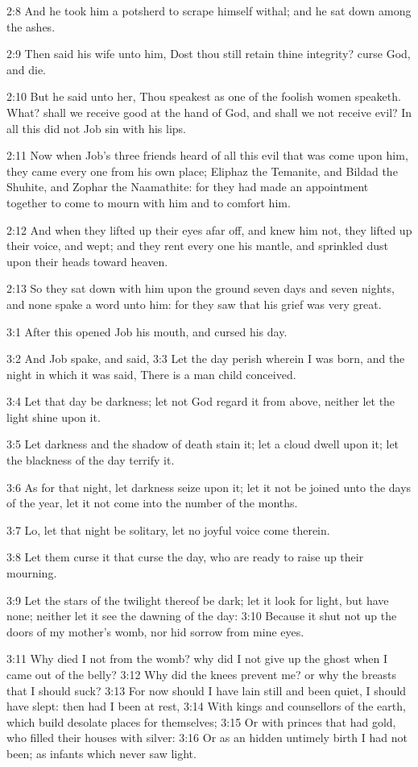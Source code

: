2:8 And he took him a potsherd to scrape himself withal; and he sat down among the ashes.

2:9 Then said his wife unto him, Dost thou still retain thine integrity?  curse God, and die.

2:10 But he said unto her, Thou speakest as one of the foolish women speaketh. What? shall we receive good at the hand of God, and shall we not receive evil? In all this did not Job sin with his lips.

2:11 Now when Job's three friends heard of all this evil that was come upon him, they came every one from his own place; Eliphaz the Temanite, and Bildad the Shuhite, and Zophar the Naamathite: for they had made an appointment together to come to mourn with him and to comfort him.

2:12 And when they lifted up their eyes afar off, and knew him not, they lifted up their voice, and wept; and they rent every one his mantle, and sprinkled dust upon their heads toward heaven.

2:13 So they sat down with him upon the ground seven days and seven nights, and none spake a word unto him: for they saw that his grief was very great.

3:1 After this opened Job his mouth, and cursed his day.

3:2 And Job spake, and said, 3:3 Let the day perish wherein I was born, and the night in which it was said, There is a man child conceived.

3:4 Let that day be darkness; let not God regard it from above, neither let the light shine upon it.

3:5 Let darkness and the shadow of death stain it; let a cloud dwell upon it; let the blackness of the day terrify it.

3:6 As for that night, let darkness seize upon it; let it not be joined unto the days of the year, let it not come into the number of the months.

3:7 Lo, let that night be solitary, let no joyful voice come therein.

3:8 Let them curse it that curse the day, who are ready to raise up their mourning.

3:9 Let the stars of the twilight thereof be dark; let it look for light, but have none; neither let it see the dawning of the day: 3:10 Because it shut not up the doors of my mother's womb, nor hid sorrow from mine eyes.

3:11 Why died I not from the womb? why did I not give up the ghost when I came out of the belly?  3:12 Why did the knees prevent me? or why the breasts that I should suck?  3:13 For now should I have lain still and been quiet, I should have slept: then had I been at rest, 3:14 With kings and counsellors of the earth, which build desolate places for themselves; 3:15 Or with princes that had gold, who filled their houses with silver: 3:16 Or as an hidden untimely birth I had not been; as infants which never saw light.

